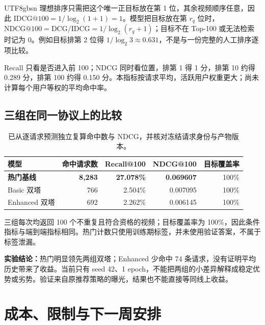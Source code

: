 \documentclass[10pt,a4paper]{article}
\begin{document}
\begin{CJK*}{UTF8}{gbsn}
理想排序只需把这个唯一正目标放在第 1 位，其余视频顺序任意，因此 $\mathrm{IDCG@100}=1/\log_2(1+1)=1$。模型把目标放在第 $r_q$ 位时，$\mathrm{NDCG@100}=\mathrm{DCG}/\mathrm{IDCG}=1/\log_2(r_q+1)$；目标不在 Top-100 或无法检索时记为 0。例如目标排第 2 位得 $1/\log_2 3\approx0.631$，不是与一份完整的人工排序逐项比较。

Recall 只看是否进入前 100；NDCG 同时看位置，排第 1 得 1 分，排第 10 约得 0.289 分，排第 100 约得 0.150 分。本指标按请求平均，活跃用户权重更大；尚未计算每个用户等权的平均命中率。

\subsection{三组在同一协议上的比较}
\begin{table}[H]\centering
\begin{tabular}{lrrrr}\toprule
模型 & 命中请求数 & Recall@100 & NDCG@100 & 目标覆盖率\\\midrule
\textbf{热门基线} & \textbf{8,283} & \textbf{27.078\%} & \textbf{0.069607} & 100\%\\
Basic 双塔 & 766 & 2.504\% & 0.007095 & 100\%\\
Enhanced 双塔 & 692 & 2.262\% & 0.006145 & 100\%\\\bottomrule
\end{tabular}\caption{已从逐请求预测独立复算命中数与 NDCG，并核对冻结请求身份与产物版本。}\end{table}
三组每次均返回 100 个不重复且符合资格的视频；目标覆盖率为 100\%，因此条件指标与端到端指标相同。热门计数只使用训练期标签，并未使用验证答案，不属于标签泄漏。

\textbf{实验结论：}热门明显领先两组双塔；Enhanced 少命中 74 条请求，没有证明平均历史带来了收益。当前只有 seed 42、1 epoch，不能把两组的小差异解释成稳定优势或劣势。验证来自原推荐策略的曝光，结果也不能直接等同线上收益。

\endgroup
\clearpage
\section{成本、限制与下一周安排}

\end{CJK*}
\end{document}
